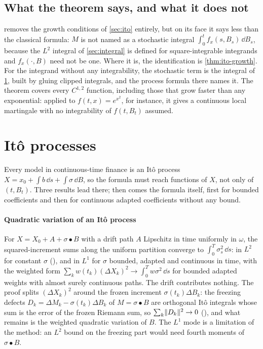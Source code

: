 \documentclass[11pt]{article}
\newcommand{\bulletB}{\mathbin{\bullet}}
\begin{document}
\subsection{What the theorem says, and what it does not}
 removes the growth conditions of \cref{sec:ito} entirely, but on its face it says less than
the classical formula: $M$ is not named as a stochastic integral $\int_0^tf_x(s,B_s)\,\dd B_s$, because the $L^2$
integral of \cref{sec:integral} is defined for square-integrable integrands and $f_x(\cdot,B)$ need not be one.
Where it is, the identification is \cref{thm:ito-growth}. For the integrand without any integrability, the
stochastic term is the integral of \cref{sec:itoprocess}, built by gluing clipped integrals, and the process formula
there names it. The theorem covers every $C^{1,2}$ function, including those that grow faster than any
exponential: applied to $f(t,x)=e^{x^2}$, for instance, it gives a continuous local martingale with no
integrability of $f(t,B_t)$ assumed.

\section{It\^o processes}\label{sec:itoprocess}

Every model in continuous-time finance is an It\^o process $X=x_0+\int b\,\dd s+\int\sigma\,\dd B$, so the
formula must reach functions of $X$, not only of $(t,B_t)$. Three results lead there; then comes the formula itself,
first for bounded coefficients and then for continuous adapted coefficients without any bound.

\paragraph{Quadratic variation of an It\^o process}
For $X=X_0+A+\sigma\bulletB B$ with a drift path $A$ Lipschitz in time uniformly in $\omega$, the squared-increment
sums along the uniform partition converge to $\int_0^T\sigma_s^2\,\dd s$: in $L^2$ for constant $\sigma$
(), and in $L^1$ for $\sigma$ bounded, adapted and continuous in time, with the weighted
form $\sum_kw(t_k)(\Delta X_k)^2\to\int_0^Tw\sigma^2\,\dd s$ for bounded adapted weights with almost surely
continuous paths. The drift contributes nothing. The proof splits $(\Delta X_k)^2$ around the frozen increment
$\sigma(t_k)\Delta B_k$: the freezing defects $D_k=\Delta M_k-\sigma(t_k)\Delta B_k$ of $M=\sigma\bulletB B$ are
orthogonal It\^o integrals whose sum is the error of the frozen Riemann sum, so $\sum_k\lVert D_k\rVert^2\to0$
(), and what remains is the weighted quadratic variation of $B$. The
$L^1$ mode is a limitation of the method: an $L^2$ bound on the freezing part would need fourth moments of
$\sigma\bulletB B$.
\end{document}
